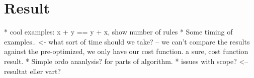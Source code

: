 
\section{Result}
* cool examples:  x + y == y + x, show number of rules
* Some timing of examples.. <- what sort of time should we take?
-- we can't compare the results against the pre-optimized, we only have our cost function.
a sure, cost function result.
* Simple ordo ananlysis? for parts of algorithm.
* issues with scope? <-- resultat eller vart?
